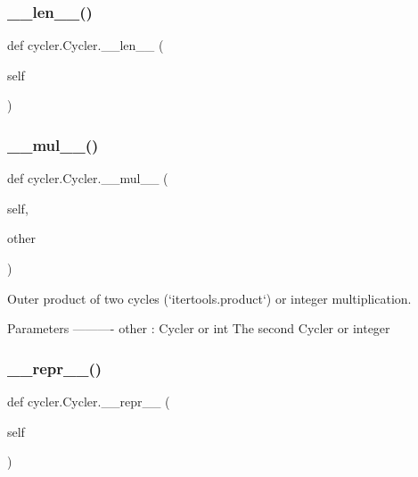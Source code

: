 \subsubsection{\texorpdfstring{\+\_\+\+\_\+len\+\_\+\+\_\+()}{\_\_len\_\_()}}
{\footnotesize\ttfamily def cycler.\+Cycler.\+\_\+\+\_\+len\+\_\+\+\_\+ (\begin{DoxyParamCaption}\item[{}]{self }\end{DoxyParamCaption})}

\mbox{\label{classcycler_1_1Cycler_ab23a068aeb44ddae0f260d477e293922}} 
\subsubsection{\texorpdfstring{\+\_\+\+\_\+mul\+\_\+\+\_\+()}{\_\_mul\_\_()}}
{\footnotesize\ttfamily def cycler.\+Cycler.\+\_\+\+\_\+mul\+\_\+\+\_\+ (\begin{DoxyParamCaption}\item[{}]{self,  }\item[{}]{other }\end{DoxyParamCaption})}

\begin{DoxyVerb}Outer product of two cycles (`itertools.product`) or integer
multiplication.

Parameters
----------
other : Cycler or int
   The second Cycler or integer
\end{DoxyVerb}
 \mbox{\label{classcycler_1_1Cycler_ac4312249bd1aeb949568ee49bf62971e}} 
\subsubsection{\texorpdfstring{\+\_\+\+\_\+repr\+\_\+\+\_\+()}{\_\_repr\_\_()}}
{\footnotesize\ttfamily def cycler.\+Cycler.\+\_\+\+\_\+repr\+\_\+\+\_\+ (\begin{DoxyParamCaption}\item[{}]{self }\end{DoxyParamCaption})}

